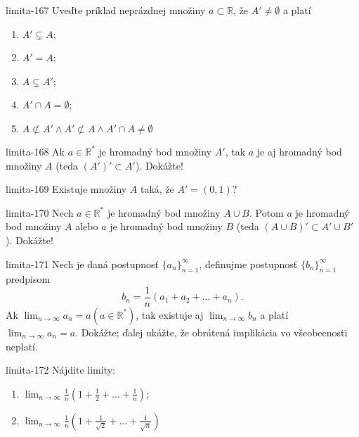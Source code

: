 \begin{defproblem}{limita-167}
Uveďte príklad neprázdnej množiny $a \subset \mathbb{R}$, že $A' \neq \emptyset$ a platí
\begin{enumerate}
\item $A' \subsetneq A$;
\item $A'=A$;
\item $A \subsetneq A'$;
\item $A' \cap A = \emptyset$;
\item $A \not\subset A'\wedge A' \not\subset A \wedge A' \cap A \neq\emptyset$
\end{enumerate}
\end{defproblem}

\begin{defproblem}{limita-168}
Ak $a \in \mathbb{R^*}$ je hromadný bod množiny $A'$, tak $a$ je aj hromadný bod množiny $A$ (teda $(A')' \subset A'$). Dokážte!
\end{defproblem}

\begin{defproblem}{limita-169}
Existuje množiny $A$ taká, že $A'=(0,1)$?
\end{defproblem}

\begin{defproblem}{limita-170}
Nech $a \in \mathbb{R^*}$ je hromadný bod množiny $A \cup B$. Potom $a$ je hromadný bod množiny $A$ alebo $a$ je hromadný bod množiny $B$ (teda $(A \cup B)' \subset A' \cup B'$). Dokážte!
\end{defproblem}

\begin{defproblem}{limita-171}
Nech je daná postupnosť ${\{a_n\}}_{n=1}^\infty$, definujme postupnosť ${\{b_n\}}_{n=1}^\infty$ predpisom
$$b_n=\frac{1}{n}(a_1+a_2+...+a_n).$$
Ak $\lim_{n \rightarrow \infty} a_n=a (a \in \mathbb{R^*})$, tak existuje aj $\lim_{n \rightarrow \infty} b_n$ a platí $\lim_{n \rightarrow \infty} a_n=a$. Dokážte; ďalej ukážte, že obrátená implikácia vo všeobecnosti neplatí.
\end{defproblem}

\begin{defproblem}{limita-172}
Nájdite limity:
\begin{enumerate}
\item $\lim_{n \rightarrow \infty} \frac{1}{n}(1+\frac{1}{2}+...+\frac{1}{n})$;
\item $\lim_{n \rightarrow \infty} \frac{1}{n}(1+\frac{1}{\sqrt{2}}+...+\frac{1}{\sqrt{n}})$
\end{enumerate}
\end{defproblem}

